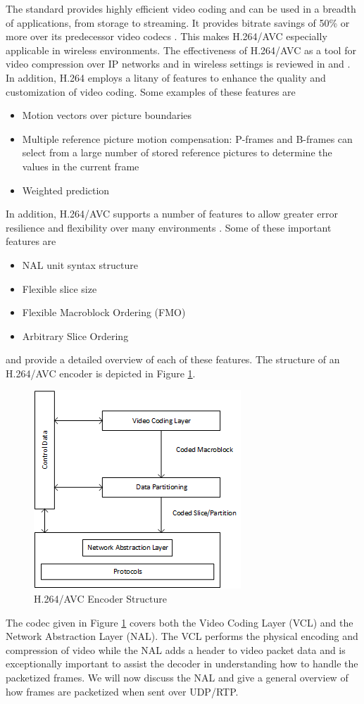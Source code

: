 \documentclass[preprint, 12pt]{elsarticle}
\begin{document}
The standard provides highly efficient video coding and can be used in a breadth of applications, from storage to streaming. It provides bitrate savings of 50\% or more over its predecessor video codecs \cite{RTP}. This makes H.264/AVC especially applicable in wireless environments. The effectiveness of H.264/AVC as a tool for video compression over IP networks and in wireless settings is reviewed  in \cite{H264OverIP} and \cite{WirelessH264}. In addition, H.264 employs a litany of features to enhance the quality and customization of video coding. Some examples of these features are 
\begin{itemize}
	\item Motion vectors over picture boundaries
	\item Multiple reference picture motion compensation: P-frames and B-frames can select from a large number of stored reference pictures to determine the values in the current frame \cite{H264AVCOverview}
	\item Weighted prediction
\end{itemize}
In addition, H.264/AVC supports a number of features to allow greater error resilience and flexibility over many environments \cite{H264AVCOverview}. Some of these important features are
\begin{itemize}
	\item NAL unit syntax structure
	\item Flexible slice size
	\item Flexible Macroblock Ordering (FMO)
	\item Arbitrary Slice Ordering
\end{itemize}
 \cite{H264AVCOverview} and \cite{H264Spec} provide a detailed overview of each of these features. The structure of an H.264/AVC encoder is depicted in Figure \ref{fig:H264EncoderStructure}.
\begin{figure}[h]
\centering
\includegraphics[width=0.4\linewidth]{H264AVCEncoderStructure.png}
\caption{H.264/AVC Encoder Structure \cite{H264AVCOverview}}
\label{fig:H264EncoderStructure}
\end{figure}
The codec given in Figure \ref{fig:H264EncoderStructure} covers both the Video Coding Layer (VCL) and the Network Abstraction Layer (NAL). The VCL performs the physical encoding and compression of video while the NAL adds a header to video packet data and is exceptionally important to assist the decoder in understanding how to handle the packetized frames. We will now discuss the NAL and give a general overview of how frames are packetized when sent over UDP/RTP. 
\end{document}
